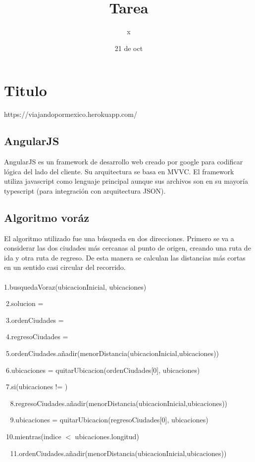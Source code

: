 \documentclass[10pt]{report}
\title{Tarea }
\author{x}
\date{21 de oct}
\begin{document}
\maketitle

\section*{Titulo}
https://viajandopormexico.herokuapp.com/

\subsection*{AngularJS}
AngularJS es un framework de desarrollo web creado por google para codificar l\'{o}gica del lado del cliente. Su arquitectura se basa en MVVC. El framework utiliza javascript como lenguaje principal aunque sus archivos son en su mayor\'{i}a typescript (para integraci\'{o}n con arquitectura JSON).

\subsection*{Algoritmo vor\'{a}z}
El algoritmo utilizado fue una b\'{u}squeda en dos direcciones. Primero se va a considerar las dos ciudades m\'{a}s cercanas al punto de origen, creando una ruta de ida y otra ruta de regreso. De esta manera se calculan las distancias m\'{a}s cortas en un sentido casi circular del recorrido.
\\
\\
1.busquedaVoraz(ubicacionInicial, ubicaciones)

$\;$2.solucion = \emptyset

$\;$3.ordenCiudades = \emptyset

$\;$4.regresoCiudades = \emptyset

$\;$5.ordenCiudades.añadir(menorDistancia(ubicacionInicial,ubicaciones))

$\;$6.ubicaciones = quitarUbicacion(ordenCiudades[0], ubicaciones)

$\;$7.si(ubicaciones != \emptyset)

$\;$
$\;$8.regresoCiudades.añadir(menorDistancia(ubicacionInicial,ubicaciones))

$\;$
$\;$9.ubicaciones = quitarUbicacion(regresoCiudades[0], ubicaciones)

$\;$10.mientras(indice $<$ ubicaciones.longitud)

$\;$
$\;$11.ordenCiudades.añadir(menorDistancia(ubicacionInicial,ubicaciones))
\end{document}
